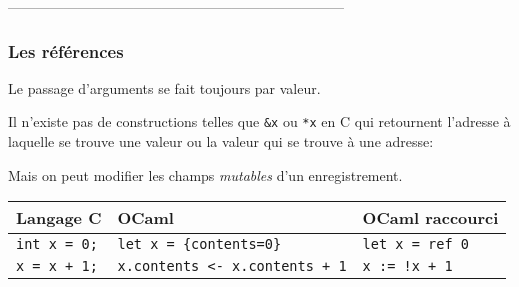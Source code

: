 ------------------------------------------------------------------------
%
\begin{frame}
\frametitle{Les références}

Le passage d'arguments se fait toujours par valeur.

Il n'existe pas de constructions telles que \verb+&x+ ou \verb+*x+ en
C qui retournent l'adresse à laquelle se trouve une valeur ou la
valeur qui se trouve à une adresse: 


Mais on peut modifier les champs \emph{mutables} d'un
enregistrement.


\begin{center}
\begin{tabular}{l|l|l}
  Langage C & OCaml & OCaml raccourci\\
  \hline 
  \verb+int x = 0;+ & \verb+let x = {contents=0}+ & \verb+let x = ref 0+\\
  \verb|x = x + 1;| & \verb|x.contents <- x.contents + 1| &
  \verb|x := !x + 1|
\end{tabular}
\end{center}


\end{frame}
